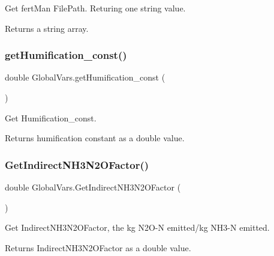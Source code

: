 Get fert\+Man File\+Path. Returing one string value. 

\begin{DoxyReturn}{Returns}
a string array. 
\end{DoxyReturn}
\mbox{\label{class_global_vars_a3c0002e83c4ffabafc32b95bf139f3d9}} 
\subsubsection{\texorpdfstring{getHumification\_const()}{getHumification\_const()}}
{\footnotesize\ttfamily double Global\+Vars.\+get\+Humification\+\_\+const (\begin{DoxyParamCaption}{ }\end{DoxyParamCaption})\hspace{0.3cm}{\ttfamily [inline]}}



Get Humification\+\_\+const. 

\begin{DoxyReturn}{Returns}
humification constant as a double value. 
\end{DoxyReturn}
\mbox{\label{class_global_vars_abd1cd815e0916bfe12a99d994b77a6d6}} 
\subsubsection{\texorpdfstring{GetIndirectNH3N2OFactor()}{GetIndirectNH3N2OFactor()}}
{\footnotesize\ttfamily double Global\+Vars.\+Get\+Indirect\+N\+H3\+N2\+O\+Factor (\begin{DoxyParamCaption}{ }\end{DoxyParamCaption})\hspace{0.3cm}{\ttfamily [inline]}}



Get Indirect\+N\+H3\+N2\+O\+Factor, the kg N2\+O-\/N emitted/kg N\+H3-\/N emitted. 

\begin{DoxyReturn}{Returns}
Indirect\+N\+H3\+N2\+O\+Factor as a double value. 
\end{DoxyReturn}
\mbox{\label{class_global_vars_a96a22d5ba43a69c0c1dd9b658e1117d4}} 
